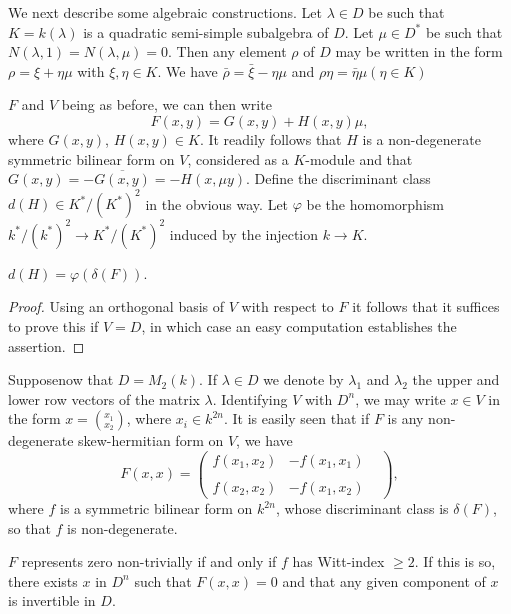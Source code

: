 We next describe some algebraic constructions. Let $\lambda \in D$ be
such that $K=k(\lambda)$ is a quadratic semi-simple subalgebra of
$D$. Let $\mu \in D^*$ be such that $N(\lambda,1)=N(\lambda, \mu
)=0$. Then any element $\rho$ of $D$ may be written in the form $\rho
= \xi +\eta\mu$ with $\xi, \eta \in K$. We have
$\bar{\rho}=\bar{\xi}-\eta \mu$ and $\rho \eta = \bar{\eta} \mu (\eta
\in K)$ 

$F$ and $V$ being as before, we can then write 
\begin{equation*}
F(x,y)=G(x,y)+H(x,y)\mu , \tag{1}\label{appen:eq1}
\end{equation*}
where $G(x,y)$, $H(x,y)\in K$. It readily follows that $H$ is a
non-degenerate symmetric bilinear form on $V$, considered as a
$K$-module and that\break $G(x,y)= -\overline{G(x,y)}= -H(x,\mu y)$. Define
the discriminant class $d(H) \in K^*/(K^*)^2$ in the obvious way. Let
$\varphi$ be the homomorphism $k^*/(k^*)^2 \to K^*/(K^*)^2$ induced by
the injection $k \to K$. 

\setcounter{section}{1}
\begin{lemma}\label{appen:lem1.1}%
$d(H) = \varphi (\delta(F))$.
\end{lemma}

\begin{proof}
Using an orthogonal basis of $V$ with respect to $F$ it follows that
it suffices to prove this if $V=D$, in which case an easy computation
establishes the assertion. 
\end{proof}

Suppose\pageoriginale now that $D=M_2(k)$. If $\lambda\in D$ we denote by
$\lambda_1$ and $\lambda_2$ the upper and lower row vectors of the
matrix $\lambda$. Identifying $V$ with $D^n$, we may write $x \in V$
in the form $x=(^{x_1}_{x_2})$, where $x_i \in k^{2n}$. It is easily
seen that if $F$ is any non-degenerate skew-hermitian form on $V$, we
have  
\begin{equation*}
F(x,x)=
\begin{pmatrix}
f(x_1,x_2) & -f(x_1,x_1) \\
& & \\
f(x_2,x_2) & -f(x_1,x_2)
\end{pmatrix},\tag{2}\label{appen:eq2}
\end{equation*} 
where $f$ is a symmetric bilinear form on $k^{2n}$, whose discriminant
class is $\delta(F)$, so that $f$ is non-degenerate. 

\begin{lemma}\label{appen:lem1.2}%
$F$ represents zero non-trivially if and only if $f$ has
  Witt-index $\ge 2$. If this is so, there exists $x$ in $D^n$ such
  that $F(x,x)=0$ and that any given component of $x$ is invertible in
  $D$. 
\end{lemma}

